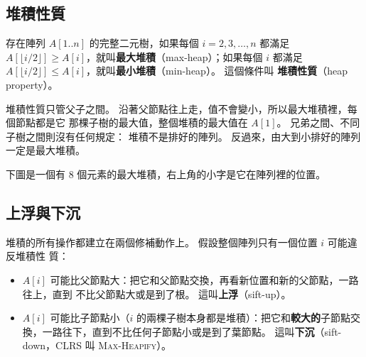 \subsection{堆積性質}

\begin{definition}
\label{def:hp-heap}
存在陣列 $A[1..n]$ 的完整二元樹，如果每個 $i = 2, 3, \ldots, n$ 都滿足
$A[\lfloor i/2 \rfloor] \ge A[i]$，就叫\textbf{最大堆積}（max-heap）；如果每個 $i$ 都滿足
$A[\lfloor i/2 \rfloor] \le A[i]$，就叫\textbf{最小堆積}（min-heap）。 這個條件叫
\textbf{堆積性質}（heap property）。
\end{definition}

堆積性質只管父子之間。 沿著父節點往上走，值不會變小，所以最大堆積裡，每個節點都是它
那棵子樹的最大值，整個堆積的最大值在 $A[1]$。 兄弟之間、不同子樹之間則沒有任何規定：
堆積不是排好的陣列。 反過來，由大到小排好的陣列一定是最大堆積。

下圖是一個有 $8$ 個元素的最大堆積，右上角的小字是它在陣列裡的位置。

\begin{center}
\label{fig:hp-heap-array}
\end{center}

\subsection{上浮與下沉}

堆積的所有操作都建立在兩個修補動作上。 假設整個陣列只有一個位置 $i$ 可能違反堆積性
質：

\begin{itemize}
\item $A[i]$ 可能比父節點大：把它和父節點交換，再看新位置和新的父節點，一路往上，直到
不比父節點大或是到了根。 這叫\textbf{上浮}（sift-up）。
\item $A[i]$ 可能比子節點小（$i$ 的兩棵子樹本身都是堆積）：把它和\textbf{較大的}子節點交
換，一路往下，直到不比任何子節點小或是到了葉節點。 這叫\textbf{下沉}（sift-down，CLRS
叫 \textsc{Max-Heapify}）。
\end{itemize}

